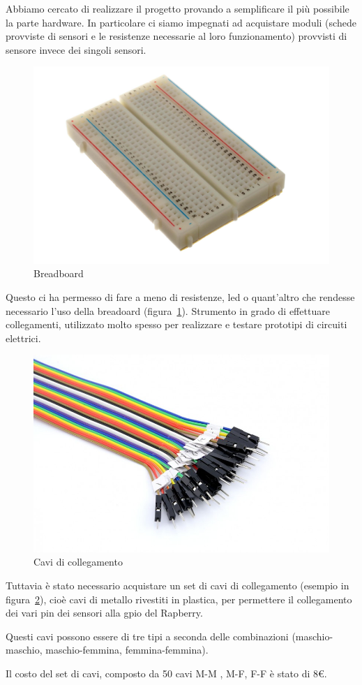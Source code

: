 Abbiamo cercato di realizzare il progetto provando a semplificare il pi\`u possibile la parte hardware.
In particolare ci siamo impegnati ad acquistare moduli (schede provviste di sensori e le resistenze necessarie al loro funzionamento) provvisti di sensore invece dei singoli sensori.

\begin{figure}
	\centering
	\includegraphics[width=0.7\linewidth]{Figures/Sensors&Rasp/breadboard}
	\caption[breadb]{Breadboard}
	\label{fig:bb}
\end{figure}

Questo ci ha permesso di fare a meno di resistenze, led o quant'altro che rendesse necessario l'uso della breadoard (figura~\ref{fig:bb}).
Strumento in grado di effettuare collegamenti, utilizzato molto spesso per realizzare e testare prototipi di circuiti elettrici.

\begin{figure}
	\centering
	\includegraphics[width=0.7\linewidth]{Figures/Sensors&Rasp/cables}
	\caption[cable]{Cavi di collegamento}
	\label{fig:cables}
\end{figure}

\newpage

Tuttavia \`e stato necessario acquistare un set di cavi di collegamento (esempio in figura~\ref{fig:cables}), cio\`e cavi di metallo rivestiti in plastica, per permettere il collegamento dei vari pin dei sensori alla gpio del Rapberry.

Questi cavi possono essere di tre tipi a seconda delle combinazioni (maschio-maschio, maschio-femmina, femmina-femmina).

Il costo del set di cavi, composto da 50 cavi M-M , M-F, F-F \`e stato di 8€.

\newpage
